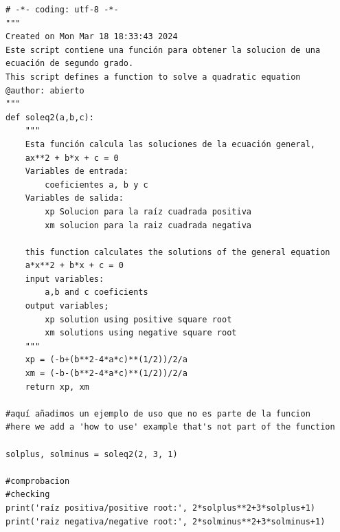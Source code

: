 \begin{verbatim}
# -*- coding: utf-8 -*-
"""
Created on Mon Mar 18 18:33:43 2024
Este script contiene una función para obtener la solucion de una 
ecuación de segundo grado.
This script defines a function to solve a quadratic equation
@author: abierto
"""
def soleq2(a,b,c):
    """
    Esta función calcula las soluciones de la ecuación general,
    ax**2 + b*x + c = 0
    Variables de entrada:
        coeficientes a, b y c
    Variables de salida:
        xp Solucion para la raíz cuadrada positiva
        xm solucion para la raiz cuadrada negativa
        
    this function calculates the solutions of the general equation
    a*x**2 + b*x + c = 0
    input variables:
        a,b and c coeficients
    output variables;
        xp solution using positive square root
        xm solutions using negative square root
    """
    xp = (-b+(b**2-4*a*c)**(1/2))/2/a
    xm = (-b-(b**2-4*a*c)**(1/2))/2/a
    return xp, xm

#aquí añadimos un ejemplo de uso que no es parte de la funcion
#here we add a 'how to use' example that's not part of the function

solplus, solminus = soleq2(2, 3, 1)

#comprobacion
#checking
print('raíz positiva/positive root:', 2*solplus**2+3*solplus+1)
print('raiz negativa/negative root:', 2*solminus**2+3*solminus+1)
\end{verbatim}

